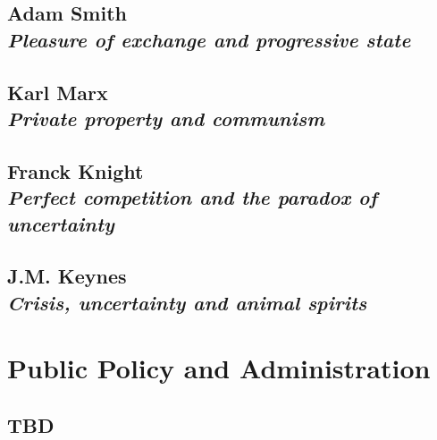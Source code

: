 \documentclass[dvipsnames,12pt]{book}
\begin{document}
        

    \chapter[Pleasure of exchange and progressive state]{Adam Smith \\[0.6cm] \textit{Pleasure of exchange and progressive state}}

    \chapter[Private property and communism]{Karl Marx \\[0.6cm] \textit{Private property and communism}}

    \chapter[Perfect competition and paradox of uncertainty]{Franck Knight\\[0.6cm] \textit{Perfect competition and the paradox of uncertainty}}

    \chapter[Crisis, uncertainty and animal spirits]{J.M. Keynes \\[0.6cm] \textit{Crisis, uncertainty and animal spirits}}

\part{Public Policy and Administration}

    \chapter{TBD}
\end{document}
